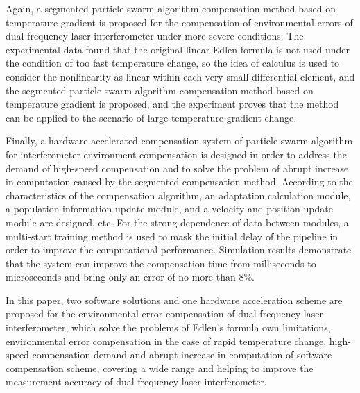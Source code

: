 \begin{abstract*}
  Again, a segmented particle swarm algorithm compensation method based on temperature gradient is proposed for the compensation of environmental errors of dual-frequency laser interferometer under more severe conditions. The experimental data found that the original linear Edlen formula is not used under the condition of too fast temperature change, so the idea of calculus is used to consider the nonlinearity as linear within each very small differential element, and the segmented particle swarm algorithm compensation method based on temperature gradient is proposed, and the experiment proves that the method can be applied to the scenario of large temperature gradient change.

  Finally, a hardware-accelerated compensation system of particle swarm algorithm for interferometer environment compensation is designed in order to address the demand of high-speed compensation and to solve the problem of abrupt increase in computation caused by the segmented compensation method. According to the characteristics of the compensation algorithm, an adaptation calculation module, a population information update module, and a velocity and position update module are designed, etc. For the strong dependence of data between modules, a multi-start training method is used to mask the initial delay of the pipeline in order to improve the computational performance. Simulation results demonstrate that the system can improve the compensation time from milliseconds to microseconds and bring only an error of no more than $8\%$.

  In this paper, two software solutions and one hardware acceleration scheme are proposed for the environmental error compensation of dual-frequency laser interferometer, which solve the problems of Edlen's formula own limitations, environmental error compensation in the case of rapid temperature change, high-speed compensation demand and abrupt increase in computation of software compensation scheme, covering a wide range and helping to improve the measurement accuracy of dual-frequency laser interferometer.
\end{abstract*}

